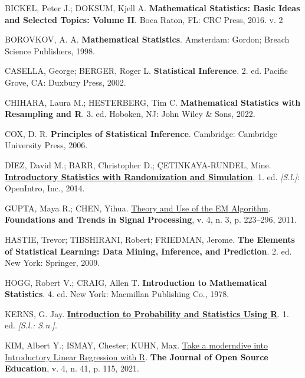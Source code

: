 \documentclass[
  letterpaper,
  DIV=11,
  numbers=noendperiod]{scrreprt}
\newlength{\cslhangindent}
\newenvironment{CSLReferences}[2] %
 {\begin{list}{}{%
  \setlength{\itemindent}{0pt}
  \setlength{\leftmargin}{0pt}
  \setlength{\parsep}{0pt}
  \ifodd #1
   \setlength{\leftmargin}{\cslhangindent}
   \setlength{\itemindent}{-1\cslhangindent}
  \fi
  \setlength{\itemsep}{#2\baselineskip}}}
 {\end{list}}
\begin{document}
\label{refs}
\begin{CSLReferences}{0}{1}
BICKEL, Peter J.; DOKSUM, Kjell A. \textbf{Mathematical Statistics:
Basic Ideas and Selected Topics: Volume II}. Boca Raton, FL: CRC Press,
2016. v. 2

BOROVKOV, A. A. \textbf{Mathematical Statistics}. Amsterdam: Gordon;
Breach Science Publishers, 1998.

CASELLA, George; BERGER, Roger L. \textbf{Statistical Inference}. 2. ed.
Pacific Grove, CA: Duxbury Press, 2002.

CHIHARA, Laura M.; HESTERBERG, Tim C. \textbf{Mathematical Statistics
with Resampling and {R}}. 3. ed. Hoboken, NJ: John Wiley \& Sons, 2022.

COX, D. R. \textbf{Principles of Statistical Inference}. Cambridge:
Cambridge University Press, 2006.

DIEZ, David M.; BARR, Christopher D.; ÇETINKAYA-RUNDEL, Mine.
\textbf{\href{https://www.openintro.org/}{Introductory Statistics with
Randomization and Simulation}}. 1. ed. \emph{{[}S.l.{]}}: OpenIntro,
Inc., 2014.

GUPTA, Maya R.; CHEN, Yihua.
\href{https://doi.org/10.1561/2000000034}{Theory and Use of the {EM}
Algorithm}. \textbf{Foundations and Trends in Signal Processing}, v. 4,
n. 3, p. 223--296, 2011.

HASTIE, Trevor; TIBSHIRANI, Robert; FRIEDMAN, Jerome. \textbf{The
Elements of Statistical Learning: Data Mining, Inference, and
Prediction}. 2. ed. New York: Springer, 2009.

HOGG, Robert V.; CRAIG, Allen T. \textbf{Introduction to Mathematical
Statistics}. 4. ed. New York: Macmillan Publishing Co., 1978.

KERNS, G. Jay.
\textbf{\href{https://ipsur.r-forge.r-project.org/}{Introduction to
Probability and Statistics Using {R}}}. 1. ed. \emph{{[}S.l.: S.n.{]}}.

KIM, Albert Y.; ISMAY, Chester; KUHN, Max.
\href{https://doi.org/10.21105/jose.00115}{Take a {moderndive} into
Introductory Linear Regression with {R}}. \textbf{The Journal of Open
Source Education}, v. 4, n. 41, p. 115, 2021.


\end{CSLReferences}
\end{document}
